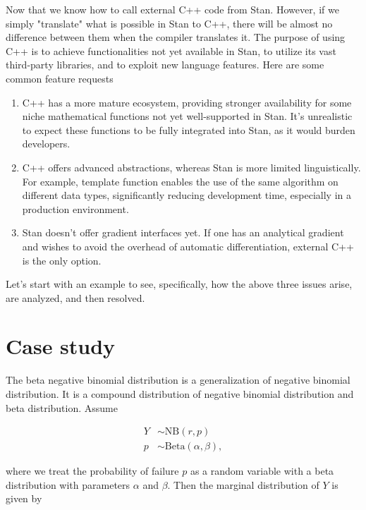 \documentclass[11pt]{article}
\begin{document}
Now that we know how to call external C++ code from Stan. However, if we simply "translate" what is possible in Stan to C++, there will be almost no difference between them when the compiler translates it. The purpose of using C++ is to achieve functionalities not yet available in Stan, to utilize its vast third-party libraries, and to exploit new language features. Here are some common feature requests
\begin{enumerate}
	\item C++ has a more mature ecosystem, providing stronger availability for some niche mathematical functions not yet well-supported in Stan. It's unrealistic to expect these functions to be fully integrated into Stan, as it would burden developers.
	\item C++ offers advanced abstractions, whereas Stan is more limited linguistically. For example, template function enables the use of the same algorithm on different data types, significantly reducing development time, especially in a production environment.
	\item Stan doesn't offer gradient interfaces yet. If one has an analytical gradient and wishes to avoid the overhead of automatic differentiation, external C++ is the only option.
\end{enumerate}

Let's start with an example to see, specifically, how the above three issues arise, are analyzed, and then resolved.








\section{Case study}

The beta negative binomial distribution is a generalization of negative binomial distribution. It is a compound distribution of negative binomial distribution and beta distribution. Assume

\begin{equation*}
  \begin{aligned}
  Y &\sim \text{NB}(r,p) \\
  p &\sim {\textrm {Beta}}(\alpha ,\beta ),
  \end{aligned}
\end{equation*}

where we treat the probability of failure $p$ as a random variable with a beta distribution with parameters $\alpha$ and $\beta$. Then the marginal distribution of $Y$ is given by
\end{document}
